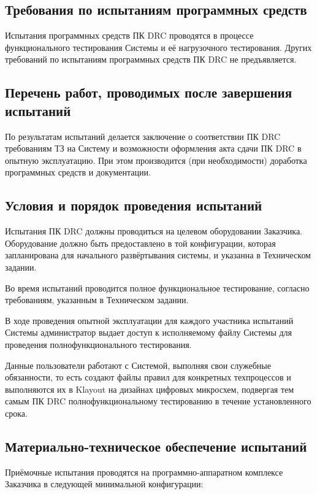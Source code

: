 \subsection{Требования по испытаниям программных средств}

Испытания программных средств ПК DRC проводятся
в процессе функционального тестирования Системы
и её нагрузочного тестирования.
Других требований по испытаниям программных средств ПК DRC не предъявляется.

\subsection{Перечень работ, проводимых после завершения испытаний}

По результатам испытаний делается заключение
о соответствии ПК DRC требованиям ТЗ на Систему
и возможности оформления акта сдачи ПК DRC в опытную эксплуатацию.
При этом производится (при необходимости) доработка программных средств
и документации.

\subsection{Условия и порядок проведения испытаний}

Испытания ПК DRC должны проводиться на целевом оборудовании Заказчика.
Оборудование должно быть предоставлено в той конфигурации,
которая запланирована для начального развёртывания системы,
и указанна в Техническом задании.

Во время испытаний проводится полное функциональное тестирование,
согласно требованиям, указанным в Техническом задании.

В ходе проведения опытной эксплуатации
для каждого участника испытаний
Системы администратор выдает доступ к исполняемому файлу Системы
для проведения полнофункционального тестирования.

Данные пользователи работают с Системой,
выполняя свои служебные обязанности,
то есть создают файлы правил для конкретных техпроцессов и выполняются
их в Klayout на дизайнах цифровых микросхем,
подвергая тем самым ПК DRC полнофункциональному тестированию
в течение установленного срока.

\subsection{Материально-техническое обеспечение испытаний}

Приёмочные испытания проводятся
на программно-аппаратном комплексе Заказчика
в следующей минимальной конфигурации:

